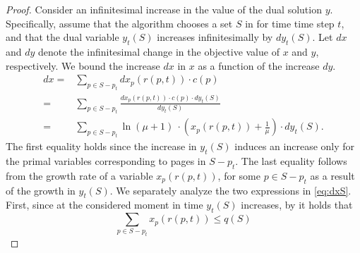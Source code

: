 \documentclass[11pt]{article}
\newcommand{\cP}{{\mathcal{P}}}
\begin{document}
\begin{proof}
	Consider an infinitesimal increase in the value of the dual solution $y$. Specifically, assume that the algorithm chooses a set $S$ in  for time time step $t$, and that the dual variable $y_t(S)$ increases infinitesimally by $d y_t(S)$. Let $dx$ and $dy$ denote the infinitesimal change in the objective value of $x$ and $y$, respectively. We bound the increase $dx$ in $x$ as a function of the increase $dy$.   
	\begin{equation}
		\label{eq:dxS}
		\begin{aligned}
			dx ={} & \sum_{p \in S-p_t} d x_p(r(p,t)) \cdot c(p) \\
			={} & \sum_{p \in S-p_t}  \frac{d x_p(r(p,t)) \cdot c(p) \cdot d y_t(S)}{d y_t(S)} \\
			={} & \sum_{p \in S-p_t} \ln \left(\mu+1 \right)\ \cdot \left( x_p(r(p,t))+\frac{1}{\mu} \right) \cdot d y_t(S). 
		\end{aligned}
	\end{equation} The first equality holds since the increase in $y_t(S)$ induces an increase only for the primal variables corresponding to pages in $S-p_t$. The last equality follows from the growth rate of a variable $x_p(r(p,t))$, for some $p \in S-p_t$ as a result of the growth in $y_t(S)$. %
	We separately analyze the two expressions in \eqref{eq:dxS}. First, since at the considered moment in time $y_t(S)$ increases, by  it holds that 
	\begin{equation}
		\label{eq:InwhileFS}
		\sum_{p \in S-p_t} x_p(r(p,t)) \leq q(S)%
	\end{equation} 
	

\end{proof}
\end{document}
